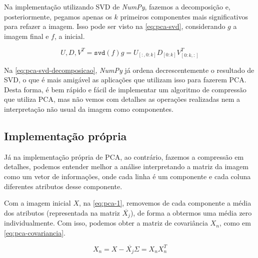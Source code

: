 \documentclass[brazilian,a4paper,twocolumn]{article}
\begin{document}
        Na implementação utilizando SVD de \emph{NumPy}, fazemos a decomposição e, posteriormente, pegamos apenas os $k$ primeiros componentes mais significativos para refazer a imagem. Isso pode ser visto na \cref{eq:pca-svd}, considerando $g$ a imagem final e $f$, a inicial.

        \begin{subequations}
            \label{eq:pca-svd}
            \begin{equation}
                \label{eq:pca-svd-decomposicao}
                U, D, V^T = \texttt{svd}(f)
            \end{equation}
            \begin{equation}
                \label{eq:pca-svd-recombinacao}
                g = U_{[:, 0:k]} D_{[0:k]} V^T_{[0:k, :]}
            \end{equation}
        \end{subequations}

        Na \cref{eq:pca-svd-decomposicao}, \emph{NumPy} já ordena decrescentemente o resultado de SVD, o que é mais amigável as aplicações que utilizam isso para fazerem PCA. Desta forma, é bem rápido e fácil de implementar um algoritmo de compressão que utiliza PCA, mas não vemos com detalhes as operações realizadas nem a interpretação não usual da imagem como componentes.

    \subsection{Implementação própria}

        Já na implementação própria de PCA, ao contrário, fazemos a compressão em detalhes, podemos entender melhor a análise interpretando a matriz da imagem como um vetor de informações, onde cada linha é um componente e cada coluna diferentes atributos desse componente.

        Com a imagem inicial $X$, na \cref{eq:pca-1}, removemos de cada componente a média dos atributos (representada na matriz $\overline{X_j}$), de forma a obtermos uma média zero individualmente. Com isso, podemos obter a matriz de covariância $X_n$, como em \cref{eq:pca-covariancia}.

        \begin{subequations}
            \label{eq:pca-1}
            \begin{equation}
                \label{eq:pca-media}
                X_n = X - \overline{X_j}
            \end{equation}
            \begin{equation}
                \label{eq:pca-covariancia}
                \Sigma = X_n X_n^T
            \end{equation}
        \end{subequations}
\end{document}
